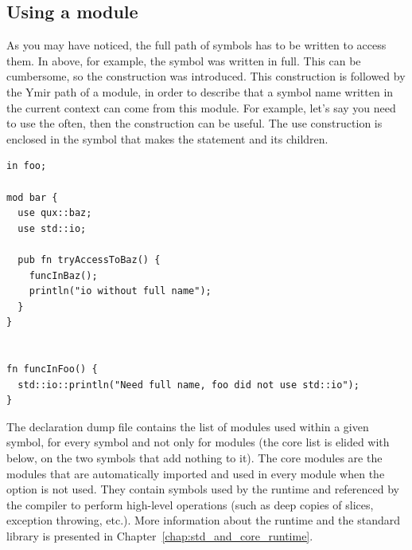 
\subsection{Using a module}

As you may have noticed, the full path of symbols has to be written to access
them. In  above, for example, the symbol
 was written in full. This can be cumbersome, so the
construction  was introduced. This construction is followed by the
Ymir path of a module, in order to describe that a symbol name written in the
current context can come from this module. For example, let's say you need to
use the  often, then the  construction can
be useful. The use construction is enclosed in the symbol that makes the
statement and its children.

\begin{lstlisting}[caption=\textit{./foo.yr}, style=coloredverbatim]
in foo;

mod bar {
  use qux::baz;
  use std::io;

  pub fn tryAccessToBaz() {
    funcInBaz();
    println("io without full name");
  }
}


fn funcInFoo() {
  std::io::println("Need full name, foo did not use std::io");
}
\end{lstlisting}

The declaration dump file  contains the list of
modules used within a given symbol, for every symbol and not only for modules
(the core list is elided with  below, on the two symbols that add
nothing to it). The core modules are the modules that are
automatically imported and used in every module when the 
option is not used. They contain symbols used by the runtime and referenced by
the compiler to perform high-level operations (such as deep copies of slices,
exception throwing, etc.). More information about the runtime and the standard
library is presented in Chapter~\ref{chap:std_and_core_runtime}.


